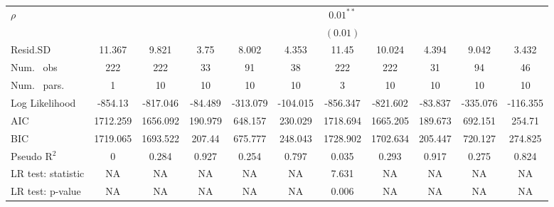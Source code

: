 \begin{table}
\begin{center}
\begin{tabular}{l c c c c c c c c c c}
$\rho$                            &               &               &               &                &                & $0.01^{**}$   &               &               &               &                \\
                                  &               &               &               &                &                & $(0.01)$      &               &               &               &                \\
\hline
Resid.SD                          & 11.367        & 9.821         & 3.75          & 8.002          & 4.353          & 11.45         & 10.024        & 4.394         & 9.042         & 3.432          \\
Num. \ obs                        & 222           & 222           & 33            & 91             & 38             & 222           & 222           & 31            & 94            & 46             \\
Num. \ pars.                      & 1             & 10            & 10            & 10             & 10             & 3             & 10            & 10            & 10            & 10             \\
Log Likelihood                    & -854.13       & -817.046      & -84.489       & -313.079       & -104.015       & -856.347      & -821.602      & -83.837       & -335.076      & -116.355       \\
AIC                               & 1712.259      & 1656.092      & 190.979       & 648.157        & 230.029        & 1718.694      & 1665.205      & 189.673       & 692.151       & 254.71         \\
BIC                               & 1719.065      & 1693.522      & 207.44        & 675.777        & 248.043        & 1728.902      & 1702.634      & 205.447       & 720.127       & 274.825        \\
Pseudo R$^2$                      & 0             & 0.284         & 0.927         & 0.254          & 0.797          & 0.035         & 0.293         & 0.917         & 0.275         & 0.824          \\
LR test: statistic                & NA            & NA            & NA            & NA             & NA             & 7.631         & NA            & NA            & NA            & NA             \\
LR test: p-value                  & NA            & NA            & NA            & NA             & NA             & 0.006         & NA            & NA            & NA            & NA             \\

\end{tabular}
\end{center}
\end{table}
